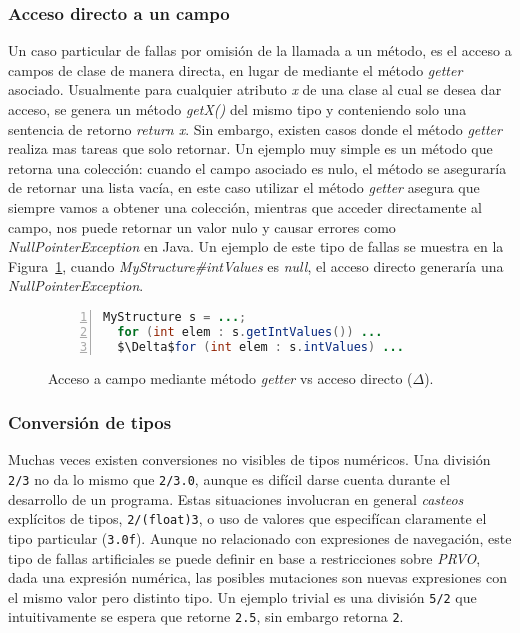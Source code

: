 \subsubsection{Acceso directo a un campo}

Un caso particular de fallas por omisi\'on de la llamada a un m\'etodo, es el acceso a campos de clase de manera directa, en lugar de mediante el m\'etodo \emph{getter} asociado. Usualmente para cualquier atributo \emph{x} de una clase al cual se desea dar acceso, se genera un m\'etodo \emph{getX()} del mismo tipo y conteniendo solo una sentencia de retorno \emph{return x}. Sin embargo, existen casos donde el m\'etodo \emph{getter} realiza mas tareas que solo retornar. Un ejemplo muy simple es un m\'etodo que retorna una colecci\'on: cuando el campo asociado es nulo, el m\'etodo se asegurar\'ia de retornar una lista vac\'ia, en este caso utilizar el m\'etodo \emph{getter} asegura que siempre vamos a obtener una colecci\'on, mientras que acceder directamente al campo, nos puede retornar un valor nulo y causar errores como \emph{NullPointerException} en Java. Un ejemplo de este tipo de fallas se muestra en la Figura~\ref{figures.examples.getterVsDirectAccess}, cuando \emph{MyStructure\#intValues} es \emph{null}, el acceso directo generar\'ia una \emph{NullPointerException}.

\begin{figure}
	\begin{lstlisting}[frame=single, numbers=left, mathescape=true,framexleftmargin=.073\textwidth,xleftmargin=.085\textwidth,xrightmargin=0.012\textwidth,language=Java,basicstyle={}]
  MyStructure s = ...;
  for (int elem : s.getIntValues()) ...
  $\Delta$for (int elem : s.intValues) ...
	\end{lstlisting}
	\caption[Ejemplo de \emph{getter} vs acceso directo]{Acceso a campo mediante m\'etodo \emph{getter} vs acceso directo ($\Delta$).}
	\label{figures.examples.getterVsDirectAccess}
\end{figure}

\subsubsection{Conversi\'on de tipos}

Muchas veces existen conversiones no visibles de tipos num\'ericos. Una divisi\'on \texttt{2/3} no da lo mismo que \texttt{2/3.0}, aunque es dif\'icil darse cuenta durante el desarrollo de un programa. Estas situaciones involucran en general \emph{casteos} expl\'icitos de tipos, \texttt{2/(float)3}, o uso de valores que especif\'ican claramente el tipo particular (\texttt{3.0f}). Aunque no relacionado con expresiones de navegaci\'on, este tipo de fallas artificiales se puede definir en base a restricciones sobre \emph{PRVO}, dada una expresi\'on num\'erica, las posibles mutaciones son nuevas expresiones con el mismo valor pero distinto tipo. Un ejemplo trivial es una divisi\'on \texttt{5/2} que intuitivamente se espera que retorne \texttt{2.5}, sin embargo retorna \texttt{2}.


